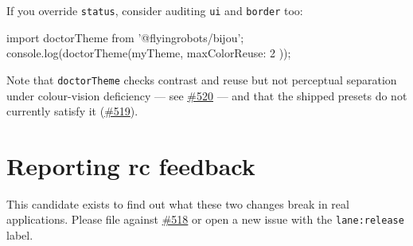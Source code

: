 If you override \texttt{s\allowbreak{}t\allowbreak{}a\allowbreak{}t\allowbreak{}u\allowbreak{}s}, consider auditing \texttt{u\allowbreak{}i} and \texttt{b\allowbreak{}o\allowbreak{}r\allowbreak{}d\allowbreak{}e\allowbreak{}r} too:

\begin{CodeBlock}
import { doctorTheme } from '@flyingrobots/bijou';
console.log(doctorTheme(myTheme, { maxColorReuse: 2 }));
\end{CodeBlock}

Note that \texttt{d\allowbreak{}o\allowbreak{}c\allowbreak{}t\allowbreak{}o\allowbreak{}r\allowbreak{}T\allowbreak{}h\allowbreak{}e\allowbreak{}m\allowbreak{}e} checks contrast and reuse but not perceptual separation under colour-vision deficiency --- see \href{https://github.com/flyingrobots/bijou/issues/520}{\#520} --- and that the shipped presets do not currently satisfy it (\href{https://github.com/flyingrobots/bijou/issues/519}{\#519}).

\section{Reporting rc feedback}\label{record-273-reporting-rc-feedback}

This candidate exists to find out what these two changes break in real applications. Please file against \href{https://github.com/flyingrobots/bijou/issues/518}{\#518} or open a new issue with the \texttt{l\allowbreak{}a\allowbreak{}n\allowbreak{}e\allowbreak{}:\allowbreak{}r\allowbreak{}e\allowbreak{}l\allowbreak{}e\allowbreak{}a\allowbreak{}s\allowbreak{}e} label.

